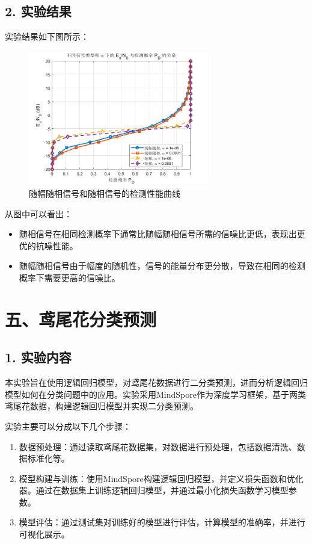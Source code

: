 \documentclass[12pt]{ctexart}
\begin{document}
\subsection*{2. 实验结果}

实验结果如下图所示：

\begin{figure}[H]
    \centering
    \includegraphics[width=0.7\textwidth]{image/output5.png}
    \caption{随幅随相信号和随相信号的检测性能曲线}
\end{figure}

从图中可以看出：

\begin{itemize}
    \item 随相信号在相同检测概率下通常比随幅随相信号所需的信噪比更低，表现出更优的抗噪性能。
    \item 随幅随相信号由于幅度的随机性，信号的能量分布更分散，导致在相同的检测概率下需要更高的信噪比。
\end{itemize}

\section*{五、鸢尾花分类预测}

\subsection*{1. 实验内容}

本实验旨在使用逻辑回归模型，对鸢尾花数据进行二分类预测，进而分析逻辑回归模型如何在分类问题中的应用。实验采用MindSpore作为深度学习框架，基于两类鸢尾花数据，构建逻辑回归模型并实现二分类预测。

实验主要可以分成以下几个步骤：
\begin{enumerate}
    \item 数据预处理：通过读取鸢尾花数据集，对数据进行预处理，包括数据清洗、数据标准化等。
    \item 模型构建与训练：使用MindSpore构建逻辑回归模型，并定义损失函数和优化器。通过在数据集上训练逻辑回归模型，并通过最小化损失函数学习模型参数。
    \item 模型评估：通过测试集对训练好的模型进行评估，计算模型的准确率，并进行可视化展示。
\end{enumerate}
\end{document}
